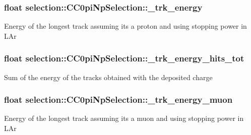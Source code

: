 \subsubsection[{\texorpdfstring{\+\_\+trk\+\_\+energy}{_trk_energy}}]{\setlength{\rightskip}{0pt plus 5cm}float selection\+::\+C\+C0pi\+Np\+Selection\+::\+\_\+trk\+\_\+energy\hspace{0.3cm}{\ttfamily [private]}}\hypertarget{classselection_1_1CC0piNpSelection_a98e03f33f34b5df397a1d1144b1de4a1}{}\label{classselection_1_1CC0piNpSelection_a98e03f33f34b5df397a1d1144b1de4a1}
Energy of the longest track assuming it\textquotesingle{}s a proton and using stopping power in L\+Ar 
\subsubsection[{\texorpdfstring{\+\_\+trk\+\_\+energy\+\_\+hits\+\_\+tot}{_trk_energy_hits_tot}}]{\setlength{\rightskip}{0pt plus 5cm}float selection\+::\+C\+C0pi\+Np\+Selection\+::\+\_\+trk\+\_\+energy\+\_\+hits\+\_\+tot\hspace{0.3cm}{\ttfamily [private]}}\hypertarget{classselection_1_1CC0piNpSelection_a82a48c6128c34252642d237b98f1b66a}{}\label{classselection_1_1CC0piNpSelection_a82a48c6128c34252642d237b98f1b66a}
Sum of the energy of the tracks obtained with the deposited charge 
\subsubsection[{\texorpdfstring{\+\_\+trk\+\_\+energy\+\_\+muon}{_trk_energy_muon}}]{\setlength{\rightskip}{0pt plus 5cm}float selection\+::\+C\+C0pi\+Np\+Selection\+::\+\_\+trk\+\_\+energy\+\_\+muon\hspace{0.3cm}{\ttfamily [private]}}\hypertarget{classselection_1_1CC0piNpSelection_aabcb2e3b6df63f077fc37d881c1794a3}{}\label{classselection_1_1CC0piNpSelection_aabcb2e3b6df63f077fc37d881c1794a3}
Energy of the longest track assuming it\textquotesingle{}s a muon and using stopping power in L\+Ar 

